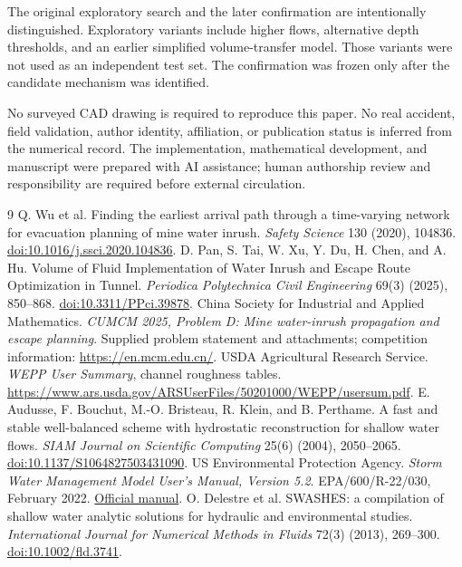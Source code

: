 \documentclass[11pt]{article}
\begin{document}
The original exploratory search and the later confirmation are intentionally distinguished. Exploratory variants include higher flows, alternative depth thresholds, and an earlier simplified volume-transfer model. Those variants were not used as an independent test set. The confirmation was frozen only after the candidate mechanism was identified.

No surveyed CAD drawing is required to reproduce this paper. No real accident, field validation, author identity, affiliation, or publication status is inferred from the numerical record. The implementation, mathematical development, and manuscript were prepared with AI assistance; human authorship review and responsibility are required before external circulation.

\begin{thebibliography}{9}\small
{}
Q. Wu et al. Finding the earliest arrival path through a time-varying network for evacuation planning of mine water inrush. \emph{Safety Science} 130 (2020), 104836.
\href{https://doi.org/10.1016/j.ssci.2020.104836}{doi:10.1016/j.ssci.2020.104836}.
D. Pan, S. Tai, W. Xu, Y. Du, H. Chen, and A. Hu.
Volume of Fluid Implementation of Water Inrush and Escape Route Optimization in Tunnel.
\emph{Periodica Polytechnica Civil Engineering} 69(3) (2025), 850--868.
\href{https://doi.org/10.3311/PPci.39878}{doi:10.3311/PPci.39878}.
China Society for Industrial and Applied Mathematics.
\emph{CUMCM 2025, Problem D: Mine water-inrush propagation and escape planning}.
Supplied problem statement and attachments; competition information:
\url{https://en.mcm.edu.cn/}.
USDA Agricultural Research Service.
\emph{WEPP User Summary}, channel roughness tables.
\url{https://www.ars.usda.gov/ARSUserFiles/50201000/WEPP/usersum.pdf}.
E. Audusse, F. Bouchut, M.-O. Bristeau, R. Klein, and B. Perthame.
A fast and stable well-balanced scheme with hydrostatic reconstruction for shallow water flows.
\emph{SIAM Journal on Scientific Computing} 25(6) (2004), 2050--2065.
\href{https://doi.org/10.1137/S1064827503431090}{doi:10.1137/S1064827503431090}.
US Environmental Protection Agency.
\emph{Storm Water Management Model User's Manual, Version 5.2}.
EPA/600/R-22/030, February 2022.
\href{https://www.epa.gov/system/files/documents/2022-02/storm-water-management-model-users-manual-version-5.2.pdf}{Official manual}.
O. Delestre et al.
SWASHES: a compilation of shallow water analytic solutions for hydraulic and environmental studies.
\emph{International Journal for Numerical Methods in Fluids} 72(3) (2013), 269--300.
\href{https://doi.org/10.1002/fld.3741}{doi:10.1002/fld.3741}.
\end{thebibliography}
\end{document}
